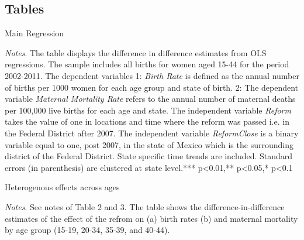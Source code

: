 \documentclass[a4paper, 11pt]{article}
\begin{document}
\begin{spacing}{1.5}
\section*{Tables}
\begin{table}[htpb!]\caption{Main Regression}\label{reg1}
\begin{threeparttable}
	  
	\begin{tablenotes}
		\footnotesize
		\item \textit{Notes}.  The table displays the difference in difference estimates from OLS regressions. The sample includes all births for women aged 15-44 for the period 2002-2011. The dependent variables 1: \textit{Birth Rate} is defined as the annual number of births per 1000 women for each age group and state of birth. 2: The dependent variable \textit{Maternal Mortality Rate} refers to the annual number of maternal deaths per 100,000 live births for each age and state. The independent variable \textit{Reform} takes the value of one in locations and time where the reform was passed i.e. in the Federal District after 2007. The independent variable \textit{ReformClose} is a binary variable equal to one, post 2007, in the state of Mexico which is the surrounding district of the Federal District. State specific time trends are included. Standard errors (in parenthesis) are clustered at state level.*** p<0.01,** p<0.05,* p<0.1
	\end{tablenotes} 
\end{threeparttable}
\end{table}
 
 
 
\begin{table}[htpb!]\caption{Heterogenous effects across ages} \label{heteromed}
	\begin{threeparttable}
		
		{\small  }
		\begin{tablenotes}
			\footnotesize
			\item \textit{Notes}.  See notes of Table 2 and 3. The table shows the difference-in-difference estimates of the effect of the refrom on (a) birth rates (b) and maternal mortality by age group (15-19, 20-34, 35-39, and 40-44).
		\end{tablenotes} 
	\end{threeparttable}
\end{table}


 	
 	 

 


\end{spacing}
\end{document}
